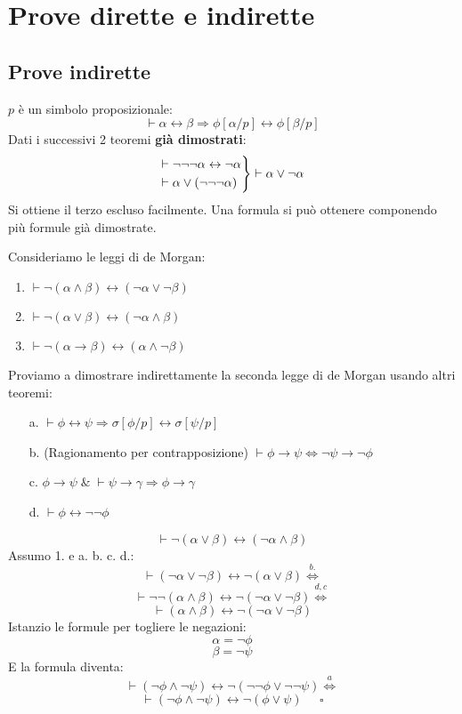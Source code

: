 \documentclass{article}
\theoremstyle{break}
\theoremstyle{break}
\theoremstyle{break}
\theoremstyle{break}
\begin{document}
\section{Prove dirette e indirette}
\subsection{Prove indirette}
\( p \) è un simbolo proposizionale:
\[
    \vdash \alpha \leftrightarrow \beta \Rightarrow \phi[\alpha/p] \leftrightarrow \phi[\beta/p]
\] 
Dati i successivi 2 teoremi \textbf{già dimostrati}:
\[
    \begin{rcases}
        \vdash \neg \neg \neg \alpha \leftrightarrow \neg \alpha \\
        \vdash \alpha \vee (\neg \neg \neg \alpha)
    \end{rcases} \vdash \alpha \vee \neg \alpha
\] 
Si ottiene il terzo escluso facilmente.
Una formula si può ottenere componendo più formule già dimostrate.

Consideriamo le leggi di de Morgan:
\begin{enumerate}
    \item \( \vdash \neg(\alpha \wedge \beta) \leftrightarrow (\neg \alpha \vee \neg \beta) \) 
    \item \( \vdash \neg (\alpha \vee \beta) \leftrightarrow (\neg \alpha \wedge \beta) \) 
    \item \( \vdash \neg (\alpha \to \beta) \leftrightarrow (\alpha \wedge \neg \beta) \) 
\end{enumerate}
Proviamo a dimostrare indirettamente la seconda legge di de Morgan usando altri teoremi:
\begin{enumerate}
    \item[a.] \( \vdash \phi \leftrightarrow \psi \Rightarrow \sigma[\phi/p] \leftrightarrow \sigma[\psi/p] \) 
    \item[b.] (Ragionamento per contrapposizione) \( \vdash \phi \to \psi \Leftrightarrow \neg \psi \to \neg \phi\) 
    \item[c.] \( \phi \to \psi\; \& \; \vdash \psi \to \gamma \Rightarrow \phi \to \gamma \)
    \item[d.] \( \vdash \phi \leftrightarrow \neg \neg \phi \) 
\end{enumerate}
\begin{example}
   \[
   \vdash \neg (\alpha \vee \beta) \leftrightarrow (\neg \alpha \wedge \beta)
   \]  
   Assumo 1. e a. b. c. d.:
\[
    \vdash (\neg \alpha \vee \neg \beta) \leftrightarrow \neg (\alpha \vee \beta) \stackrel{b.}{\Leftrightarrow}
\] 
\[
    \vdash \neg \neg (\alpha \wedge \beta) \leftrightarrow \neg (\neg \alpha \vee \neg \beta) \stackrel{d, c}{\Leftrightarrow}
\] 
\[
 \vdash   (\alpha \wedge \beta) \leftrightarrow \neg (\neg \alpha \vee \neg \beta)
\] 
Istanzio le formule per togliere le negazioni:
\[
\alpha = \neg \phi
\] 
\[
\beta = \neg \psi
\] 
E la formula diventa:
\[
    \vdash (\neg \phi \wedge \neg \psi) \leftrightarrow \neg(\neg \neg \phi \vee \neg \neg \psi) \stackrel{a}{\Leftrightarrow}
\] 
\[
\vdash (\neg \phi \wedge \neg \psi) \leftrightarrow \neg(\phi \vee \psi)\;\;\;\;\; \square
\] 
\end{example}
\end{document}
